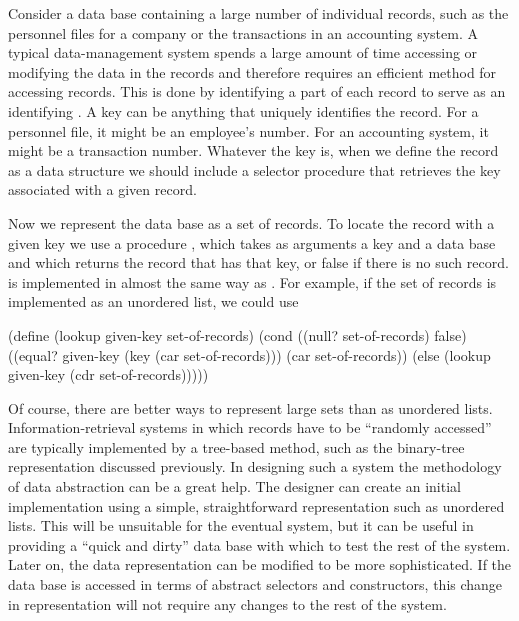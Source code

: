 Consider a data base containing a large number of individual records, such as
the personnel files for a company or the transactions in an accounting system.
A typical data-management system spends a large amount of time accessing or
modifying the data in the records and therefore requires an efficient method
for accessing records.  This is done by identifying a part of each record to
serve as an identifying .  A key can be anything that uniquely
identifies the record.  For a personnel file, it might be an employee's 
number.  For an accounting system, it might be a transaction number.  Whatever
the key is, when we define the record as a data structure we should include a
 selector procedure that retrieves the key associated with a given
record.

Now we represent the data base as a set of records. To locate the record with a
given key we use a procedure , which takes as arguments a key and
a data base and which returns the record that has that key, or false if there
is no such record.   is implemented in almost the same way as
.  For example, if the set of records is implemented as
an unordered list, we could use

\begin{codeBlock}
(define (lookup given-key set-of-records)
  (cond ((null? set-of-records) false)
        ((equal? given-key (key (car set-of-records)))
         (car set-of-records))
        (else (lookup given-key (cdr set-of-records)))))
\end{codeBlock}

\noindent
Of course, there are better ways to represent large sets than as unordered
lists.  Information-retrieval systems in which records have to be ``randomly
accessed'' are typically implemented by a tree-based method, such as the
binary-tree representation discussed previously.  In designing such a system
the methodology of data abstraction can be a great help.  The designer can
create an initial implementation using a simple, straightforward representation
such as unordered lists.  This will be unsuitable for the eventual system, but
it can be useful in providing a ``quick and dirty'' data base with which to
test the rest of the system.  Later on, the data representation can be modified
to be more sophisticated.  If the data base is accessed in terms of abstract
selectors and constructors, this change in representation will not require any
changes to the rest of the system.

